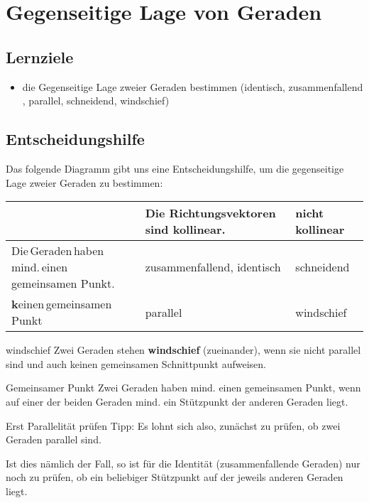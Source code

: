 \section{Gegenseitige Lage von Geraden}

\subsection*{Lernziele}
\begin{itemize}
  \item die Gegenseitige Lage zweier Geraden bestimmen (identisch,
    zusammenfallend
    ,
    parallel,
    schneidend, windschief)
\end{itemize}

\subsection{Entscheidungshilfe}
Das folgende Diagramm gibt uns eine Entscheidungshilfe, um die
gegenseitige Lage zweier Geraden zu bestimmen:

\vspace{3mm}

\begin{tabular}{p{60mm}|p{50mm}|p{50mm}}
  & Die Richtungsvektoren sind kollinear. &  \textbf{nicht} kollinear\\\hline
Die\,Geraden\,haben mind.\,einen\,gemeinsamen Punkt.  & zusammenfallend, identisch& schneidend\\\hline
\textbf{k}einen\,gemeinsamen Punkt & parallel & windschief
\end{tabular}

\begin{definition}{windschief}{}
  Zwei Geraden stehen \textbf{windschief} (zueinander), wenn sie nicht
  parallel sind und auch keinen gemeinsamen Schnittpunkt aufweisen.
\end{definition}

\begin{bemerkung}{Gemeinsamer Punkt}{}
  Zwei Geraden haben mind. einen gemeinsamen Punkt, wenn auf einer der
  beiden Geraden mind. ein Stützpunkt der anderen Geraden liegt.  
\end{bemerkung}

\begin{bemerkung}{Erst Parallelität prüfen}{}
Tipp: Es lohnt sich also, zunächst zu prüfen, ob zwei Geraden parallel
sind.

Ist dies nämlich der Fall, so ist für die Identität (zusammenfallende
Geraden) nur noch zu prüfen, ob ein beliebiger Stützpunkt auf der
jeweils anderen Geraden liegt.
\end{bemerkung}




